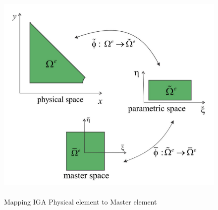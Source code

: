 \documentclass[11pt]{article}
\begin{document}
\begin{figure}[H]
	\begin{center}
		\includegraphics[scale=0.3]{Physical_Master.png} 
		\caption{\\Mapping IGA Physical element to Master
			element \cite{agrawal2019iga}}\label{MasterPhysical}
	\end{center}	
\end{figure}
\end{document}
